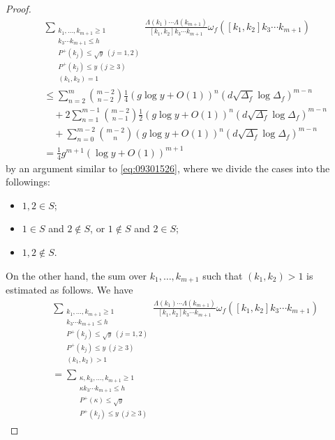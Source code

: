 \documentclass[a4paper,11pt]{amsart}
\theoremstyle{definition}
\numberwithin{equation}{section}
\begin{document}
\begin{proof}
\begin{align}\label{eq:09301657}
&\sum_{\substack{k_1,\ldots,k_{m+1} \geq 1 \\ [k_1,k_2] k_3 \cdots k_{m+1} \leq h \\ P^+(k_j) \leq \sqrt{y} ~(j=1,2) \\ P^+(k_j) \leq y ~(j \geq 3) \\ (k_1,k_2)=1}} 
\frac{\Lambda(k_1) \cdots \Lambda(k_{m+1})}{[k_1,k_2] k_3 \cdots k_{m+1}} \omega_f([k_1,k_2] k_3 \cdots k_{m+1}) \\
&\leq \sum_{n=2}^{m} \binom{m-2}{n-2} \frac{1}{4} \left(g \log{y}+O(1)\right)^{n} \left(d \sqrt{\Delta_f} \log{\Delta_f}\right)^{m-n} \nonumber \\
&\quad
+ 2\sum_{n=1}^{m-1} \binom{m-2}{n-1} \frac{1}{2} \left(g \log{y}+O(1)\right)^{n} \left(d \sqrt{\Delta_f} \log{\Delta_f}\right)^{m-n} \nonumber\\
&\quad
+ \sum_{n=0}^{m-2} \binom{m-2}{n} \left(g \log{y}+O(1)\right)^{n} \left(d \sqrt{\Delta_f} \log{\Delta_f}\right)^{m-n} \nonumber\\
&= \frac{1}{4} g^{m+1} (\log{y}+O(1))^{m+1} \nonumber
\end{align}
by an argument similar to \eqref{eq:09301526}, where we divide the cases into the followings: 
\begin{itemize}
\item[$(\mathrm{a})$]
$1,2 \in S$;
\item[$(\mathrm{b})$]
$1 \in S$ and $2 \notin S$, or $1 \notin S$ and $2 \in S$; 
\item[$(\mathrm{c})$]
$1,2 \notin S$. 
\end{itemize}
On the other hand, the sum over $k_1, \ldots,k_{m+1}$ such that $(k_1,k_2)>1$ is estimated as follows. 
We have  
\begin{align*}
&\sum_{\substack{k_1,\ldots,k_{m+1} \geq 1 \\ [k_1,k_2]k_3 \cdots k_{m+1} \leq h \\ P^+(k_j) \leq \sqrt{y} ~(j=1,2) \\ P^+(k_j) \leq y ~(j \geq 3) \\ (k_1,k_2)>1}} 
\frac{\Lambda(k_1) \cdots \Lambda(k_{m+1})}{[k_1,k_2]k_3 \cdots k_{m+1}} \omega_f([k_1,k_2]k_3 \cdots k_{m+1}) \\
&= \sum_{\substack{\kappa,k_3,\ldots,k_{m+1} \geq 1 \\ \kappa k_3 \cdots k_{m+1} \leq h \\ P^+(\kappa) \leq \sqrt{y} \\ P^+(k_j) \leq y ~(j \geq 3) }}

\end{align*}
\end{proof}
\end{document}
